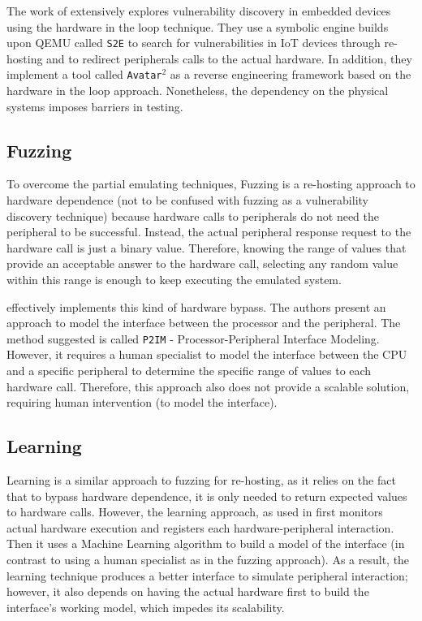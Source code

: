 \documentclass[12pt]{article}
\begin{document}
The work of \cite{avatar2} extensively explores vulnerability discovery in embedded devices using the hardware in the loop technique. They use a symbolic engine builds upon QEMU called {\tt S2E} to search for vulnerabilities in IoT devices through re-hosting and to redirect peripherals calls to the actual hardware. In addition, they implement a tool called {\tt Avatar$^2$} as a reverse engineering framework based on the hardware in the loop approach.  Nonetheless, the dependency on the physical systems imposes barriers in testing.

\subsection{Fuzzing}

To overcome the partial emulating techniques, Fuzzing is a re-hosting approach to hardware dependence (not to be confused with fuzzing as a vulnerability discovery technique) because hardware calls to peripherals do not need the peripheral to be successful. Instead, the actual peripheral response request to the hardware call is just a binary value. Therefore, knowing the range of values that provide an acceptable answer to the hardware call, selecting any random value within this range is enough to keep executing the emulated system.

\cite{p2im} effectively implements this kind of hardware bypass.  The authors present an approach to model the interface between the processor and the peripheral. The method suggested is called {\tt P2IM} - Processor-Peripheral Interface Modeling.  However, it requires a human specialist to model the interface between the CPU and a specific peripheral to determine the specific range of values to each hardware call. Therefore, this approach also does not provide a scalable solution, requiring human intervention (to model the interface).

\subsection{Learning}

Learning is a similar approach to fuzzing for re-hosting, as it relies on the fact that to bypass hardware dependence, it is only needed to return expected values to hardware calls. However, the learning approach, as used in \cite{pretender} first monitors actual hardware execution and registers each hardware-peripheral interaction. Then it uses a Machine Learning algorithm to build a model of the interface (in contrast to using a human specialist as in the fuzzing approach). As a result, the learning technique produces a better interface to simulate peripheral interaction; however, it also depends on having the actual hardware first to build the interface's working model, which impedes its scalability.
\end{document}
